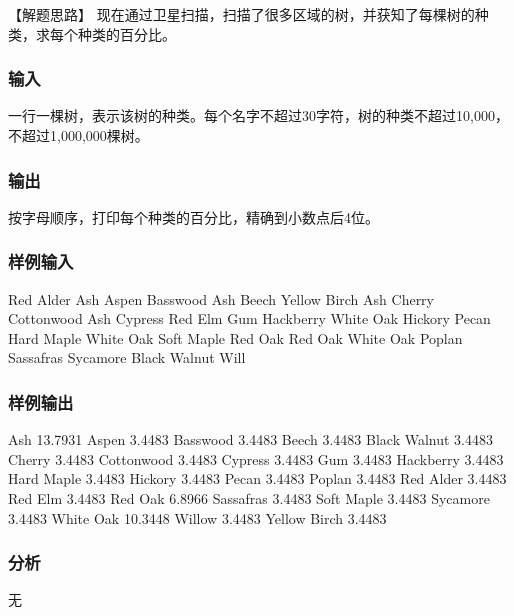 【解题思路】
现在通过卫星扫描，扫描了很多区域的树，并获知了每棵树的种类，求每个种类的百分比。


\subsubsection{输入}
一行一棵树，表示该树的种类。每个名字不超过30字符，树的种类不超过10,000，不超过1,000,000棵树。


\subsubsection{输出}
按字母顺序，打印每个种类的百分比，精确到小数点后4位。

\subsubsection{样例输入}
\begin{Code}
Red Alder
Ash
Aspen
Basswood
Ash
Beech
Yellow Birch
Ash
Cherry
Cottonwood
Ash
Cypress
Red Elm
Gum
Hackberry
White Oak
Hickory
Pecan
Hard Maple
White Oak
Soft Maple
Red Oak
Red Oak
White Oak
Poplan
Sassafras
Sycamore
Black Walnut
Will
\end{Code}

\subsubsection{样例输出}
\begin{Code}
Ash 13.7931
Aspen 3.4483
Basswood 3.4483
Beech 3.4483
Black Walnut 3.4483
Cherry 3.4483
Cottonwood 3.4483
Cypress 3.4483
Gum 3.4483
Hackberry 3.4483
Hard Maple 3.4483
Hickory 3.4483
Pecan 3.4483
Poplan 3.4483
Red Alder 3.4483
Red Elm 3.4483
Red Oak 6.8966
Sassafras 3.4483
Soft Maple 3.4483
Sycamore 3.4483
White Oak 10.3448
Willow 3.4483
Yellow Birch 3.4483
\end{Code}

\subsubsection{分析}
无


